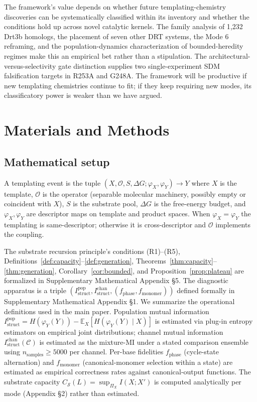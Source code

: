 \documentclass[aps,prx,reprint,amsmath,amssymb,floatfix,superscriptaddress,nofootinbib]{revtex4-2}
\theoremstyle{plain-thm}
\theoremstyle{definition-thm}
\newcommand{\Istructpop}{I_{\mathrm{struct}}^{\mathrm{pop}}}
\newcommand{\Istructchan}{I_{\mathrm{struct}}^{\mathrm{chan}}}
\newcommand{\fphase}{f_{\mathrm{phase}}}
\newcommand{\fmonomer}{f_{\mathrm{monomer}}}
\newcommand{\Csub}{C_{\mathcal{S}}}
\newcommand{\descX}{\varphi_X}
\newcommand{\descY}{\varphi_Y}
\newcommand{\Op}{\mathcal{O}}
\begin{document}
The framework's value depends on whether future templating-chemistry discoveries can be systematically classified within its inventory and whether the conditions hold up across novel catalytic kernels. The family analysis of 1{,}232 Drt3b homologs, the placement of seven other DRT systems, the Mode 6 reframing, and the population-dynamics characterization of bounded-heredity regimes make this an empirical bet rather than a stipulation. The architectural-versus-selectivity gate distinction supplies two single-experiment SDM falsification targets in R253A and G248A. The framework will be productive if new templating chemistries continue to fit; if they keep requiring new modes, its classificatory power is weaker than we have argued.


\section{Materials and Methods}

\subsection{Mathematical setup}

A templating event is the tuple $(X, \Op, S, \Delta G; \descX, \descY) \to Y$ where $X$ is the template, $\Op$ is the operator (separable molecular machinery, possibly empty or coincident with $X$), $S$ is the substrate pool, $\Delta G$ is the free-energy budget, and $\descX, \descY$ are descriptor maps on template and product spaces. When $\descX = \descY$ the templating is same-descriptor; otherwise it is cross-descriptor and $\Op$ implements the coupling.

The substrate recursion principle's conditions (R1)--(R5), Definitions~\ref{def:capacity}--\ref{def:generation}, Theorems~\ref{thm:capacity}--\ref{thm:generation}, Corollary~\ref{cor:bounded}, and Proposition~\ref{prop:plateau} are formalized in Supplementary Mathematical Appendix \S5. The diagnostic apparatus is a triple $(\Istructpop, \Istructchan, (\fphase, \fmonomer))$ defined formally in Supplementary Mathematical Appendix \S1. We summarize the operational definitions used in the main paper. Population mutual information $\Istructpop = H(\descY(Y)) - \mathbb{E}_X[H(\descY(Y) \mid X)]$ is estimated via plug-in entropy estimators on empirical joint distributions; channel mutual information $\Istructchan(\mathcal{C})$ is estimated as the mixture-MI under a stated comparison ensemble using $n_{\mathrm{samples}} \ge 5000$ per channel. Per-base fidelities $\fphase$ (cycle-state alternation) and $\fmonomer$ (canonical-monomer selection within a state) are estimated as empirical correctness rates against canonical-output functions. The substrate capacity $\Csub(L) = \sup_{\Pi_X} I(X; X')$ is computed analytically per mode (Appendix \S2) rather than estimated.
\end{document}
